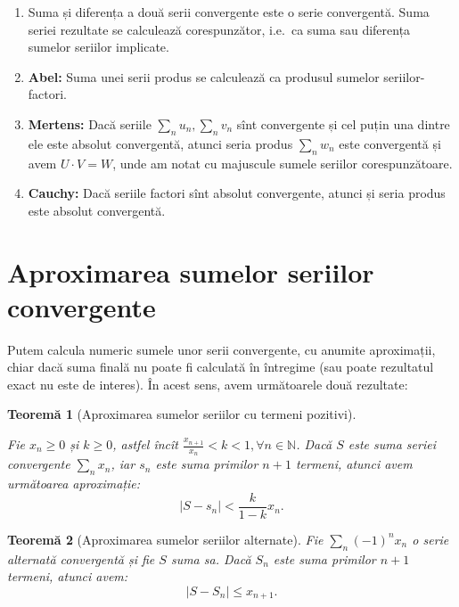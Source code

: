 \documentclass[11pt,a4paper]{article}
\newcommand\NN{\mathbb{N}}
\theoremstyle{dotless}
\newtheorem{theorem}{Teorem\u{a}}[section]
\theoremstyle{dotlessdr}
\begin{document}
\begin{enumerate}[(1)]
  \item Suma și diferența a două serii convergente este o serie convergentă. Suma
    seriei rezultate se calculează corespunzător, i.e.\ ca suma sau diferența
    sumelor seriilor implicate.
  \item \textbf{Abel:} Suma unei serii produs se calculează ca produsul sumelor
    seriilor-factori.
  \item \textbf{Mertens:} Dacă seriile $\sum_n u_n, \sum_n v_n$ sînt convergente și
    cel puțin una dintre ele este absolut convergentă, atunci seria produs
    $\sum_n w_n$ este convergentă și avem $U \cdot V = W$, unde am notat cu majuscule
    sumele seriilor corespunzătoare.
  \item \textbf{Cauchy:} Dacă seriile factori sînt absolut convergente, atunci și seria
    produs este absolut convergentă.
\end{enumerate}



\section{Aproximarea sumelor seriilor convergente}

Putem calcula numeric sumele unor serii convergente, cu anumite aproximații,
chiar dacă suma finală nu poate fi calculată în întregime (sau poate rezultatul
exact nu este de interes). În acest sens, avem următoarele două rezultate:

\begin{theorem}[Aproximarea sumelor seriilor cu termeni pozitivi]\label{thm:aprox-poz}
  
  Fie $x_n \geq 0$ și $k \geq 0$, astfel încît $\frac{x_{n+1}}{x_n} < k < 1, \forall n \in \NN$.
  Dacă $S$ este suma seriei convergente $\sum_n x_n$, iar $s_n$ este suma primilor $n + 1$
  termeni, atunci avem următoarea aproximație:
  \[
    | S - s_n | < \frac{k}{1 - k} x_n.
  \]
\end{theorem}

\begin{theorem}[Aproximarea sumelor seriilor alternate]\label{thm:aprox-alt}
  Fie $\sum_n (-1)^n x_n$ o serie alternată convergentă și fie $S$ suma sa. Dacă $S_n$ este suma
  primilor $n + 1$ termeni, atunci avem:
  \[
    | S - S_n | \leq x_{n + 1}.
  \]
\end{theorem}
\end{document}
